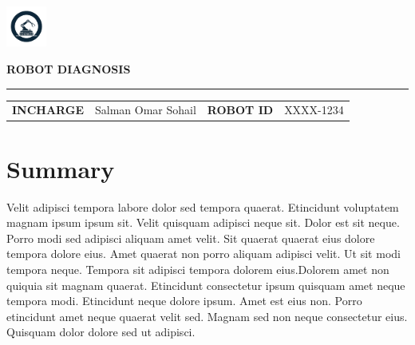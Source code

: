 \documentclass[10pt]{article}
\begin{document}

\thispagestyle{firstpage}

\begin{flushright}
    \includegraphics[width=0.1\textwidth]{ latex_assets/logo.png }
\end{flushright}

\vspace{-3.5em}

\begin{center}
    {\Huge \textcolor{primary_color}{\textbf{\MakeUppercase{ Robot Diagnosis }}}} \\[0.3em]
    \textcolor{lightgray}{\rule{\textwidth}{1pt}} %
\end{center}

\vspace{1cm}

\noindent
\begin{tabularx}{\textwidth}{>{\raggedright\arraybackslash}p{3cm} X >{\raggedright\arraybackslash}p{3cm} X}
  \textbf{\textcolor{primary_color}{INCHARGE}} & Salman Omar Sohail &
  \textbf{\textcolor{primary_color}{ROBOT ID}} & XXXX-1234 \\
\end{tabularx}

\vspace{1cm}

\section*{Summary}

\noindent
Velit adipisci tempora labore dolor sed tempora quaerat. Etincidunt voluptatem magnam ipsum ipsum sit. Velit quisquam adipisci neque sit. Dolor est sit neque. Porro modi sed adipisci aliquam amet velit. Sit quaerat quaerat eius dolore tempora dolore eius. Amet quaerat non porro aliquam adipisci velit. Ut sit modi tempora neque. Tempora sit adipisci tempora dolorem eius.\vspace{0.5cm}Dolorem amet non quiquia sit magnam quaerat. Etincidunt consectetur ipsum quisquam amet neque tempora modi. Etincidunt neque dolore ipsum. Amet est eius non. Porro etincidunt amet neque quaerat velit sed. Magnam sed non neque consectetur eius. Quisquam dolor dolore sed ut adipisci.
\end{document}
